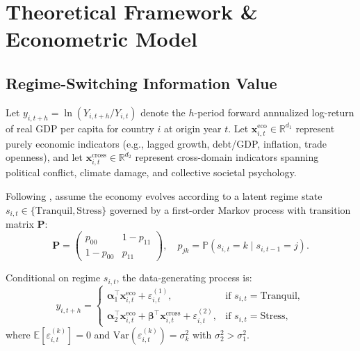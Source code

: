 \documentclass[11pt,a4paper]{article}
\begin{document}
\section{Theoretical Framework \& Econometric Model}

\subsection{Regime-Switching Information Value}
Let $y_{i, t+h} = \ln(Y_{i, t+h} / Y_{i, t})$ denote the $h$-period forward annualized log-return of real GDP per capita for country $i$ at origin year $t$. Let $\mathbf{x}_{i,t}^{\text{eco}} \in \mathbb{R}^{d_1}$ represent purely economic indicators (e.g., lagged growth, debt/GDP, inflation, trade openness), and let $\mathbf{x}_{i,t}^{\text{cross}} \in \mathbb{R}^{d_2}$ represent cross-domain indicators spanning political conflict, climate damage, and collective societal psychology.

Following \citet{hamilton1989}, assume the economy evolves according to a latent regime state $s_{i,t} \in \{\text{Tranquil}, \text{Stress}\}$ governed by a first-order Markov process with transition matrix $\mathbf{P}$:
\begin{equation}
\mathbf{P} = \begin{pmatrix} p_{00} & 1 - p_{11} \\ 1 - p_{00} & p_{11} \end{pmatrix}, \quad p_{jk} = \mathbb{P}(s_{i,t} = k \mid s_{i,t-1} = j).
\end{equation}

Conditional on regime $s_{i,t}$, the data-generating process is:
\begin{equation}
y_{i, t+h} = 
\begin{cases}
\boldsymbol{\alpha}_1^\top \mathbf{x}_{i,t}^{\text{eco}} + \varepsilon_{i,t}^{(1)}, & \text{if } s_{i,t} = \text{Tranquil}, \\
\boldsymbol{\alpha}_2^\top \mathbf{x}_{i,t}^{\text{eco}} + \boldsymbol{\beta}^\top \mathbf{x}_{i,t}^{\text{cross}} + \varepsilon_{i,t}^{(2)}, & \text{if } s_{i,t} = \text{Stress},
\end{cases}
\end{equation}
where $\mathbb{E}[\varepsilon_{i,t}^{(k)}] = 0$ and $\text{Var}(\varepsilon_{i,t}^{(k)}) = \sigma_k^2$ with $\sigma_2^2 > \sigma_1^2$.
\end{document}
